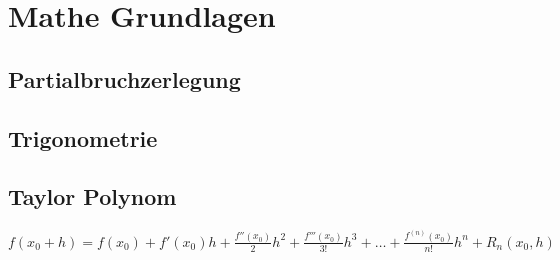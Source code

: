 \section{Mathe Grundlagen}	

	\subsection{Partialbruchzerlegung}
		
			
	\subsection{Trigonometrie}
			
			
	\subsection{Taylor Polynom}
		$f(x_0+h)=f(x_0) + f'(x_0)h + \frac{f''(x_0)}{2}h^2 + \frac{f'''(x_0)}{3!}h^3 + \ldots + \frac{f^{(n)}(x_0)}{n!}h^n + R_n(x_0, h)$

